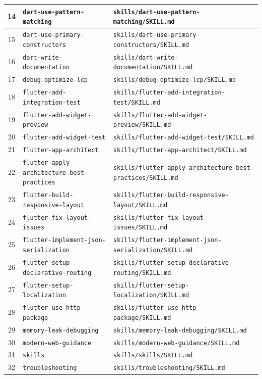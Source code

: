 \begin{longtable}{|c|p{}|p{}|}
14 & \texttt{dart-use-pattern-matching} & \texttt{skills/dart-use-pattern-matching/SKILL.md} \\ \hline
15 & \texttt{dart-use-primary-constructors} & \texttt{skills/dart-use-primary-constructors/SKILL.md} \\ \hline
16 & \texttt{dart-write-documentation} & \texttt{skills/dart-write-documentation/SKILL.md} \\ \hline
17 & \texttt{debug-optimize-lcp} & \texttt{skills/debug-optimize-lcp/SKILL.md} \\ \hline
18 & \texttt{flutter-add-integration-test} & \texttt{skills/flutter-add-integration-test/SKILL.md} \\ \hline
19 & \texttt{flutter-add-widget-preview} & \texttt{skills/flutter-add-widget-preview/SKILL.md} \\ \hline
20 & \texttt{flutter-add-widget-test} & \texttt{skills/flutter-add-widget-test/SKILL.md} \\ \hline
21 & \texttt{flutter-app-architect} & \texttt{skills/flutter-app-architect/SKILL.md} \\ \hline
22 & \texttt{flutter-apply-architecture-best-practices} & \texttt{skills/flutter-apply-architecture-best-practices/SKILL.md} \\ \hline
23 & \texttt{flutter-build-responsive-layout} & \texttt{skills/flutter-build-responsive-layout/SKILL.md} \\ \hline
24 & \texttt{flutter-fix-layout-issues} & \texttt{skills/flutter-fix-layout-issues/SKILL.md} \\ \hline
25 & \texttt{flutter-implement-json-serialization} & \texttt{skills/flutter-implement-json-serialization/SKILL.md} \\ \hline
26 & \texttt{flutter-setup-declarative-routing} & \texttt{skills/flutter-setup-declarative-routing/SKILL.md} \\ \hline
27 & \texttt{flutter-setup-localization} & \texttt{skills/flutter-setup-localization/SKILL.md} \\ \hline
28 & \texttt{flutter-use-http-package} & \texttt{skills/flutter-use-http-package/SKILL.md} \\ \hline
29 & \texttt{memory-leak-debugging} & \texttt{skills/memory-leak-debugging/SKILL.md} \\ \hline
30 & \texttt{modern-web-guidance} & \texttt{skills/modern-web-guidance/SKILL.md} \\ \hline
31 & \texttt{skills} & \texttt{skills/skills/SKILL.md} \\ \hline
32 & \texttt{troubleshooting} & \texttt{skills/troubleshooting/SKILL.md} \\ \hline
\end{longtable}
\normalsize
